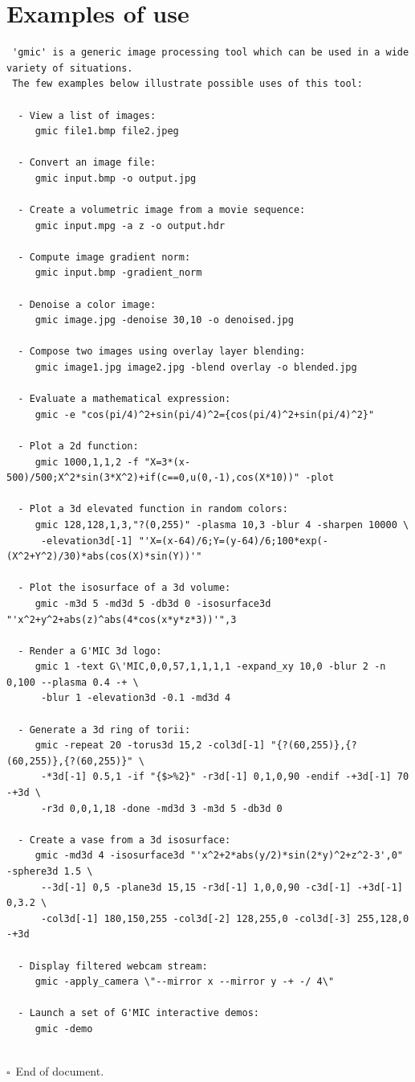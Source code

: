 \documentclass[a4paper,11pt,twoside]{book}
\begin{document}
\section{Examples of use}
\small
\begin{lstlisting}
 'gmic' is a generic image processing tool which can be used in a wide variety of situations. 
 The few examples below illustrate possible uses of this tool: 
 
  - View a list of images: 
     gmic file1.bmp file2.jpeg 
 
  - Convert an image file: 
     gmic input.bmp -o output.jpg 
 
  - Create a volumetric image from a movie sequence: 
     gmic input.mpg -a z -o output.hdr 
 
  - Compute image gradient norm: 
     gmic input.bmp -gradient_norm 
 
  - Denoise a color image: 
     gmic image.jpg -denoise 30,10 -o denoised.jpg 
 
  - Compose two images using overlay layer blending: 
     gmic image1.jpg image2.jpg -blend overlay -o blended.jpg 
 
  - Evaluate a mathematical expression: 
     gmic -e "cos(pi/4)^2+sin(pi/4)^2={cos(pi/4)^2+sin(pi/4)^2}" 
 
  - Plot a 2d function: 
     gmic 1000,1,1,2 -f "X=3*(x-500)/500;X^2*sin(3*X^2)+if(c==0,u(0,-1),cos(X*10))" -plot 
 
  - Plot a 3d elevated function in random colors: 
     gmic 128,128,1,3,"?(0,255)" -plasma 10,3 -blur 4 -sharpen 10000 \ 
      -elevation3d[-1] "'X=(x-64)/6;Y=(y-64)/6;100*exp(-(X^2+Y^2)/30)*abs(cos(X)*sin(Y))'" 
 
  - Plot the isosurface of a 3d volume: 
     gmic -m3d 5 -md3d 5 -db3d 0 -isosurface3d "'x^2+y^2+abs(z)^abs(4*cos(x*y*z*3))'",3 
 
  - Render a G'MIC 3d logo: 
     gmic 1 -text G\'MIC,0,0,57,1,1,1,1 -expand_xy 10,0 -blur 2 -n 0,100 --plasma 0.4 -+ \ 
      -blur 1 -elevation3d -0.1 -md3d 4 
 
  - Generate a 3d ring of torii: 
     gmic -repeat 20 -torus3d 15,2 -col3d[-1] "{?(60,255)},{?(60,255)},{?(60,255)}" \ 
      -*3d[-1] 0.5,1 -if "{$>%2}" -r3d[-1] 0,1,0,90 -endif -+3d[-1] 70 -+3d \ 
      -r3d 0,0,1,18 -done -md3d 3 -m3d 5 -db3d 0 
 
  - Create a vase from a 3d isosurface: 
     gmic -md3d 4 -isosurface3d "'x^2+2*abs(y/2)*sin(2*y)^2+z^2-3',0" -sphere3d 1.5 \ 
      --3d[-1] 0,5 -plane3d 15,15 -r3d[-1] 1,0,0,90 -c3d[-1] -+3d[-1] 0,3.2 \ 
      -col3d[-1] 180,150,255 -col3d[-2] 128,255,0 -col3d[-3] 255,128,0 -+3d 
 
  - Display filtered webcam stream: 
     gmic -apply_camera \"--mirror x --mirror y -+ -/ 4\" 
 
  - Launch a set of G'MIC interactive demos: 
     gmic -demo 

\end{lstlisting}
\normalsize
 
\printindex 
~\\$\square$~End of document. 
\end{document}
